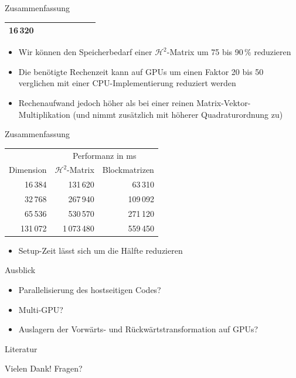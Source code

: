 \documentclass[10pt]{beamer}
\begin{document}
\begin{frame}{Zusammenfassung}
\begin{table}[ht]
{\begin{tabular}{rrrrrrrr}
         16\,320 \\
        \bottomrule
      \end{tabular}
    }
  \end{table}
  \begin{itemize}
    \item Wir können den Speicherbedarf einer \(\mathcal{H}^2\)-Matrix um
          75 bis 90\,\% reduzieren
    \item Die benötigte Rechenzeit kann auf GPUs um einen Faktor 20 bis 50
          verglichen mit einer CPU-Implementierung reduziert werden
    \item Rechenaufwand jedoch höher als bei einer reinen
          Matrix-Vektor-Multiplikation (und nimmt zusätzlich mit höherer
          Quadraturordnung zu)
  \end{itemize}
\end{frame}

\begin{frame}{Zusammenfassung}
  \small
  \begin{table}
    \begin{tabular}{rrr} \toprule
                & \multicolumn{2}{c}{Performanz in ms} \\ \cmidrule{2-3}
      Dimension & \(\mathcal{H}^2\)-Matrix & Blockmatrizen \\ \midrule
          16\,384 &                     131\,620 &   63\,310 \\
          32\,768 &                     267\,940 &  109\,092 \\
          65\,536 &                     530\,570 &  271\,120 \\
         131\,072 &                  1\,073\,480 &  559\,450 \\ \bottomrule
      \end{tabular}
    \end{table}
  \normalsize
  \begin{itemize}
    \item Setup-Zeit lässt sich um die Hälfte reduzieren
  \end{itemize}
\end{frame}

\begin{frame}{Ausblick}
  \begin{itemize}
    \item Parallelisierung des hostseitigen Codes?
    \item Multi-GPU\@?
    \item Auslagern der Vorwärts- und Rückwärtstransformation auf GPUs?
  \end{itemize}
\end{frame}
\begin{frame}[allowframebreaks]{Literatur}

  \printbibliography
  \nocite{*}

\end{frame}

\begin{frame}
  \Huge Vielen Dank! Fragen?
\end{frame}
\end{document}
